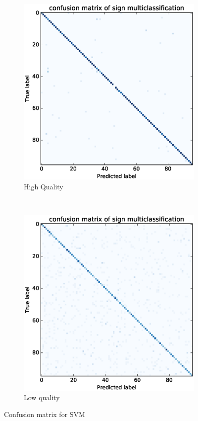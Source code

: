 \documentclass[twocolumn]{article}
\begin{document}
\begin{figure}[h]
\centering
\begin{subfigure}[b]{0.48\linewidth}
        \includegraphics[trim=100 22 80 39, clip,width=1.0\linewidth]{results/svm_high_quality_confusion}
        \caption{High Quality}
\end{subfigure}%
~
\begin{subfigure}[b]{0.48\linewidth}
        \includegraphics[trim=100 22 80 39, clip,width=1.0\linewidth]{results/svm_low_quality_confusion}
        \caption{Low quality}
\end{subfigure}%
\vspace{-2mm}
\caption{Confusion matrix for SVM}
\label{fig:confusion_matrix_svm}
\end{figure}
\end{document}
